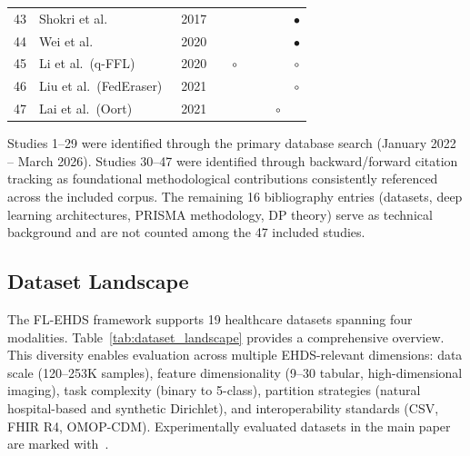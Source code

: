 \documentclass[conference]{IEEEtran}
\begin{document}
\begin{table}[htbp]
\begin{tabular}{clccccccc}
43 & Shokri et al.~\cite{shokri2017membership} & 2017 & & & & & & $\bullet$ \\
44 & Wei et al.~\cite{wei2020federated} & 2020 & & & & & & $\bullet$ \\
45 & Li et al.\ (q-FFL)~\cite{li2020fair} & 2020 & & $\circ$ & & & & $\circ$ \\
46 & Liu et al.\ (FedEraser)~\cite{liu2021federaser} & 2021 & & & & & & $\circ$ \\
47 & Lai et al.\ (Oort)~\cite{lai2021oort} & 2021 & & & & & $\circ$ & \\
\bottomrule
\end{tabular}
\par{\footnotesize Studies 1--29 were identified through the primary database search (January 2022 -- March 2026). Studies 30--47 were identified through backward/forward citation tracking as foundational methodological contributions consistently referenced across the included corpus. The remaining 16 bibliography entries (datasets, deep learning architectures, PRISMA methodology, DP theory) serve as technical background and are not counted among the 47 included studies.}
\end{table}

\subsection{Dataset Landscape}
\label{sec:dataset_landscape}

The FL-EHDS framework supports 19 healthcare datasets spanning four modalities. Table~\ref{tab:dataset_landscape} provides a comprehensive overview. This diversity enables evaluation across multiple EHDS-relevant dimensions: data scale (120--253K samples), feature dimensionality (9--30 tabular, high-dimensional imaging), task complexity (binary to 5-class), partition strategies (natural hospital-based and synthetic Dirichlet), and interoperability standards (CSV, FHIR R4, OMOP-CDM). Experimentally evaluated datasets in the main paper are marked with~\checkmark.
\end{document}
